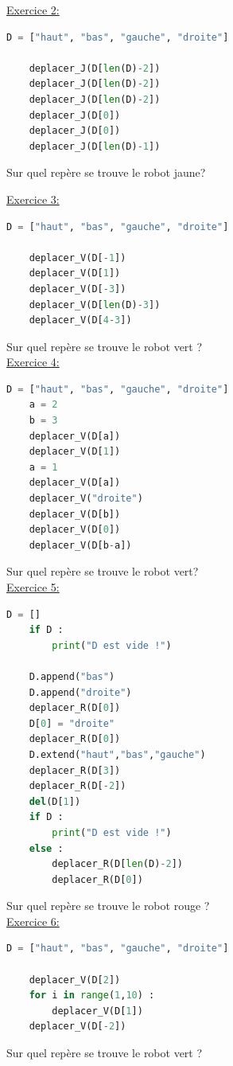 \underline{Exercice 2:}
\begin{lstlisting}[language=Python]
    D = ["haut", "bas", "gauche", "droite"]

    deplacer_J(D[len(D)-2])
    deplacer_J(D[len(D)-2])
    deplacer_J(D[len(D)-2])
    deplacer_J(D[0])
    deplacer_J(D[0])
    deplacer_J(D[len(D)-1])
\end{lstlisting}
Sur quel repère se trouve le robot jaune?

\newpage
\underline{Exercice 3:}
\begin{lstlisting}[language=Python]
    D = ["haut", "bas", "gauche", "droite"]

    deplacer_V(D[-1])
    deplacer_V(D[1])
    deplacer_V(D[-3])
    deplacer_V(D[len(D)-3])
    deplacer_V(D[4-3])
\end{lstlisting}
Sur quel repère se trouve le robot vert ?\\

\underline{Exercice 4:}
\begin{lstlisting}[language=Python]
    D = ["haut", "bas", "gauche", "droite"]
    a = 2
    b = 3
    deplacer_V(D[a])
    deplacer_V(D[1])
    a = 1
    deplacer_V(D[a])
    deplacer_V("droite")
    deplacer_V(D[b])
    deplacer_V(D[0])
    deplacer_V(D[b-a])
\end{lstlisting}
Sur quel repère se trouve le robot vert?\\

\underline{Exercice 5:}
\begin{lstlisting}[language=Python]
    D = []
    if D :
        print("D est vide !")

    D.append("bas")
    D.append("droite")
    deplacer_R(D[0])
    D[0] = "droite"
    deplacer_R(D[0])
    D.extend("haut","bas","gauche")
    deplacer_R(D[3])
    deplacer_R(D[-2])
    del(D[1])
    if D :
        print("D est vide !")
    else :
        deplacer_R(D[len(D)-2])
        deplacer_R(D[0])
\end{lstlisting}
Sur quel repère se trouve le robot rouge ?\\

\underline{Exercice 6:}
\begin{lstlisting}[language=Python]
    D = ["haut", "bas", "gauche", "droite"]

    deplacer_V(D[2])
    for i in range(1,10) :
        deplacer_V(D[1])
    deplacer_V(D[-2])
\end{lstlisting}
Sur quel repère se trouve le robot vert ?\\

